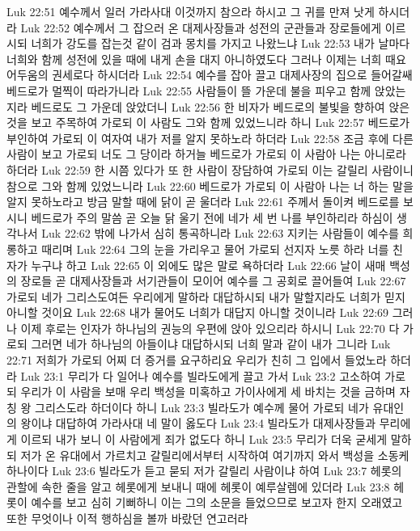 Luk 22:51  예수께서 일러 가라사대 이것까지 참으라 하시고 그 귀를 만져 낫게 하시더라
Luk 22:52  예수께서 그 잡으러 온 대제사장들과 성전의 군관들과 장로들에게 이르시되 너희가 강도를 잡는것 같이 검과 몽치를 가지고 나왔느냐
Luk 22:53  내가 날마다 너희와 함께 성전에 있을 때에 내게 손을 대지 아니하였도다 그러나 이제는 너희 때요 어두움의 권세로다 하시더라
Luk 22:54  예수를 잡아 끌고 대제사장의 집으로 들어갈쌔 베드로가 멀찍이 따라가니라
Luk 22:55  사람들이 뜰 가운데 불을 피우고 함께 앉았는지라 베드로도 그 가운데 앉았더니
Luk 22:56  한 비자가 베드로의 불빛을 향하여 앉은 것을 보고 주목하여 가로되 이 사람도 그와 함께 있었느니라 하니
Luk 22:57  베드로가 부인하여 가로되 이 여자여 내가 저를 알지 못하노라 하더라
Luk 22:58  조금 후에 다른 사람이 보고 가로되 너도 그 당이라 하거늘 베드로가 가로되 이 사람아 나는 아니로라 하더라
Luk 22:59  한 시쯤 있다가 또 한 사람이 장담하여 가로되 이는 갈릴리 사람이니 참으로 그와 함께 있었느니라
Luk 22:60  베드로가 가로되 이 사람아 나는 너 하는 말을 알지 못하노라고 방금 말할 때에 닭이 곧 울더라
Luk 22:61  주께서 돌이켜 베드로를 보시니 베드로가 주의 말씀 곧 오늘 닭 울기 전에 네가 세 번 나를 부인하리라 하심이 생각나서
Luk 22:62  밖에 나가서 심히 통곡하니라
Luk 22:63  지키는 사람들이 예수를 희롱하고 때리며
Luk 22:64  그의 눈을 가리우고 물어 가로되 선지자 노릇 하라 너를 친 자가 누구냐 하고
Luk 22:65  이 외에도 많은 말로 욕하더라
Luk 22:66  날이 새매 백성의 장로들 곧 대제사장들과 서기관들이 모이어 예수를 그 공회로 끌어들여
Luk 22:67  가로되 네가 그리스도여든 우리에게 말하라 대답하시되 내가 말할지라도 너희가 믿지 아니할 것이요
Luk 22:68  내가 물어도 너희가 대답지 아니할 것이니라
Luk 22:69  그러나 이제 후로는 인자가 하나님의 권능의 우편에 앉아 있으리라 하시니
Luk 22:70  다 가로되 그러면 네가 하나님의 아들이냐 대답하시되 너희 말과 같이 내가 그니라
Luk 22:71  저희가 가로되 어찌 더 증거를 요구하리요 우리가 친히 그 입에서 들었노라 하더라
Luk 23:1  무리가 다 일어나 예수를 빌라도에게 끌고 가서
Luk 23:2  고소하여 가로되 우리가 이 사람을 보매 우리 백성을 미혹하고 가이사에게 세 바치는 것을 금하며 자칭 왕 그리스도라 하더이다 하니
Luk 23:3  빌라도가 예수께 물어 가로되 네가 유대인의 왕이냐 대답하여 가라사대 네 말이 옳도다
Luk 23:4  빌라도가 대제사장들과 무리에게 이르되 내가 보니 이 사람에게 죄가 없도다 하니
Luk 23:5  무리가 더욱 굳세게 말하되 저가 온 유대에서 가르치고 갈릴리에서부터 시작하여 여기까지 와서 백성을 소동케 하나이다
Luk 23:6  빌라도가 듣고 묻되 저가 갈릴리 사람이냐 하여
Luk 23:7  헤롯의 관할에 속한 줄을 알고 헤롯에게 보내니 때에 헤롯이 예루살렘에 있더라
Luk 23:8  헤롯이 예수를 보고 심히 기뻐하니 이는 그의 소문을 들었으므로 보고자 한지 오래였고 또한 무엇이나 이적 행하심을 볼까 바랐던 연고러라
